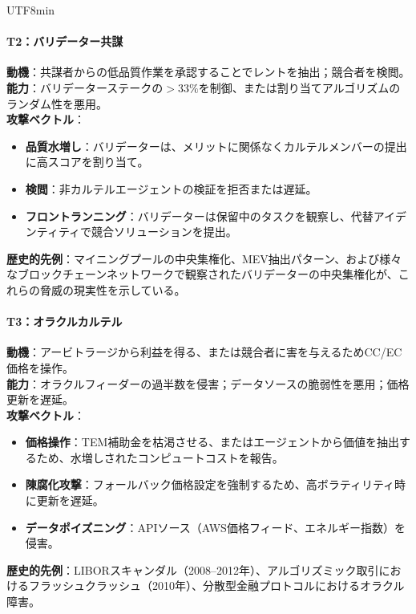 \documentclass[11pt]{article}
\begin{document}
\begin{CJK}{UTF8}{min}
\begin{itemize}[noitemsep]
\paragraph{T2：バリデーター共謀}
\textbf{動機}：共謀者からの低品質作業を承認することでレントを抽出；競合者を検閲。\\
\textbf{能力}：バリデーターステークの$>33\%$を制御、または割り当てアルゴリズムのランダム性を悪用。\\
\textbf{攻撃ベクトル}：
\begin{itemize}[noitemsep]
  \item \textbf{品質水増し}：バリデーターは、メリットに関係なくカルテルメンバーの提出に高スコアを割り当て。
  \item \textbf{検閲}：非カルテルエージェントの検証を拒否または遅延。
  \item \textbf{フロントランニング}：バリデーターは保留中のタスクを観察し、代替アイデンティティで競合ソリューションを提出。
\end{itemize}
\textbf{歴史的先例}：マイニングプールの中央集権化、MEV抽出パターン、および様々なブロックチェーンネットワークで観察されたバリデーターの中央集権化が、これらの脅威の現実性を示している。

\paragraph{T3：オラクルカルテル}
\textbf{動機}：アービトラージから利益を得る、または競合者に害を与えるためCC/EC価格を操作。\\
\textbf{能力}：オラクルフィーダーの過半数を侵害；データソースの脆弱性を悪用；価格更新を遅延。\\
\textbf{攻撃ベクトル}：
\begin{itemize}[noitemsep]
  \item \textbf{価格操作}：TEM補助金を枯渇させる、またはエージェントから価値を抽出するため、水増しされたコンピュートコストを報告。
  \item \textbf{陳腐化攻撃}：フォールバック価格設定を強制するため、高ボラティリティ時に更新を遅延。
  \item \textbf{データポイズニング}：APIソース（AWS価格フィード、エネルギー指数）を侵害。
\end{itemize}
\textbf{歴史的先例}：LIBORスキャンダル（2008--2012年）、アルゴリズミック取引におけるフラッシュクラッシュ（2010年）、分散型金融プロトコルにおけるオラクル障害。


\end{itemize}
\end{CJK}
\end{document}
